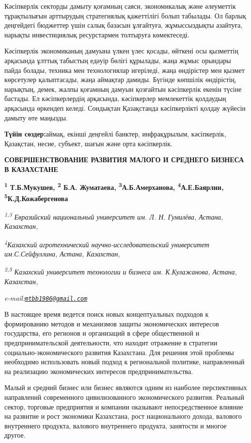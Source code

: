Кәсіпкерлік секторды дамыту қоғамның саяси, экономикалық және әлеуметтік
тұрақтылығын арттырудың стратегиялық қажеттілігі болып табылады. Ол
барлық деңгейдегі бюджеттер үшін салық базасын ұлғайтуға, жұмыссыздықты
азайтуға, нарықты инвестициялық ресурстармен толтыруға көмектеседі.

Кәсіпкерлік экономиканың дамуына үлкен үлес қосады, өйткені осы
қызметтің арқасында ұлттық табыстың едәуір бөлігі құрылады, жаңа жұмыс
орындары пайда болады, техника мен технологиялар игеріледі, жаңа
өндірістер мен қызмет көрсетулер қалыптасады, жаңа аймақтар дамиды.
Бүгінде көпшілік өндірістің, нарықтың, демек, жалпы қоғамның дамуын
қозғайтын кәсіпкерлік екенін түсіне бастады. Ел кәсіпкерлердің
арқасында, кәсіпкерлер мемлекеттік қолдаудың арқасында өркендеп келеді.
Сондықтан Қазақстанда кәсіпкерлікті қолдау жүйесін дамыту өте маңызды.

{\bfseries Түйін сөздер:}аймақ, екінші деңгейлі банктер, инфрақұрылым,
кәсіпкерлік, Қазақстан, несие, субъект, шағын және орта кәсіпкерлік.

{\bfseries СОВЕРШЕНСТВОВАНИЕ РАЗВИТИЯ МАЛОГО И СРЕДНЕГО БИЗНЕСА В
КАЗАХСТАНЕ}

{\bfseries \textsuperscript{1} Т.Б.Мукушев\textsuperscript{\envelope },
\textsuperscript{2} Б.А. Жуматаева, \textsuperscript{3}А.Б.Амерханова,
\textsuperscript{4}А.Е.Баярлин, \textsuperscript{5}К.Д.Кожабергенова}

\emph{\textsuperscript{1,3} Евразийский национальный университет им. Л.
Н. Гумилёва, Астана, Казахстан,}

\emph{\textsuperscript{4}Казахский агротехнический
научно-исследовательский университет им.С.Сейфуллина, Астана,
Казахстан,}

\emph{\textsuperscript{2,5} Казахский университет технологии и бизнеса
им. К.Кулажанова, Астана, Казахстан,}

\emph{e-mail:\href{mailto:mtbb1986@gmail.com}{\nolinkurl{mtbb1986@gmail.com}}}

В настоящее время ведется поиск новых концептуальных подходов к
формированию методов и механизмов защиты экономических интересов
государства, его регионов и организаций в сфере общественной и
предпринимательской деятельности, что находит отражение в стратегии
социально-экономического развития Казахстана. Для решения этой проблемы
необходимо использовать новый подход к региональной политике,
направленный на реализацию экономических интересов предпринимательства.

Малый и средний бизнес или бизнес являются одним из наиболее
перспективных направлений современного цивилизованного экономического
развития. Реальный сектор, торговые предприятия и компании оказывают
непосредственное влияние на развитие и рост экономики Казахстана, рост
национального дохода, валового внутреннего продукта, валового
внутреннего продукта, занятости и многое другое.

